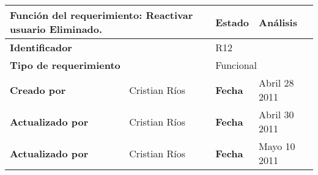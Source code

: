 \begin{center}
\begin{longtable}{|p{}|p{}|p{}|p{}|}
\hline
\multicolumn{2}{|p{0.45\textwidth}|}{{\bf {Función del requerimiento:}}
Reactivar usuario Eliminado. } & {\bf{ Estado}} & Análisis \\
\hline
\multicolumn{2}{|p{0.45\textwidth}}{\bf Identificador} &
\multicolumn{2}{|p{0.45\textwidth}|}{R12} \\
\hline
\multicolumn{2}{|p{0.45\textwidth}}{\bf {Tipo de requerimiento}} &
\multicolumn{2}{|p{0.45\textwidth}|}{Funcional}\\
\hline
\bf {Creado por} & Cristian Ríos& \bf {Fecha } & Abril 28 2011\\
\hline
\bf {Actualizado por} & Cristian Ríos & \bf {Fecha  }& Abril 30 2011\\
\hline
\bf {Actualizado por} & Cristian Ríos & \bf {Fecha  }& Mayo 10 2011\\



\end{longtable}
\end{center}
